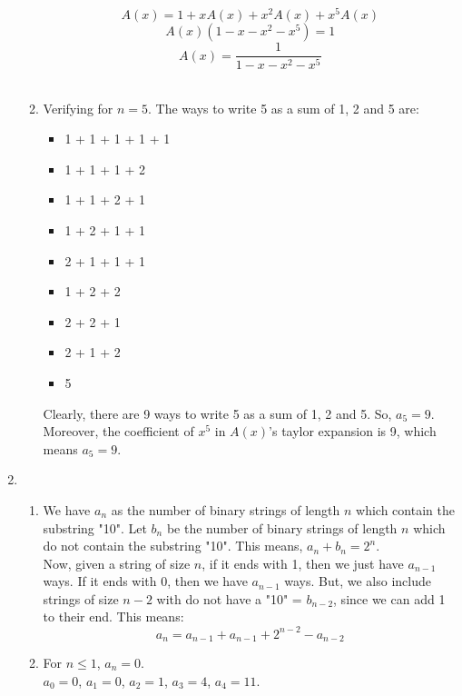 \documentclass[a4paper]{article}
\begin{document}
\begin{enumerate}
\begin{enumerate}
        \[ A(x) = 1 + xA(x) + x^2A(x) + x^5A(x) \]
        \[ A(x) (1 - x - x^2 - x^5) = 1 \]
        \[ A(x) = \frac{1}{1 - x - x^2 - x^5} \] \\

        \item Verifying for $n = 5$. The ways to write 5 as a sum of 1, 2 and 5 are:
        \begin{itemize}
            \item 1 + 1 + 1 + 1 + 1
            \item 1 + 1 + 1 + 2
            \item 1 + 1 + 2 + 1
            \item 1 + 2 + 1 + 1
            \item 2 + 1 + 1 + 1
            \item 1 + 2 + 2
            \item 2 + 2 + 1
            \item 2 + 1 + 2
            \item 5
        \end{itemize}

        Clearly, there are 9 ways to write 5 as a sum of 1, 2 and 5. So, $a_5 = 9$. Moreover, the coefficient of $x^5$ in $A(x)$'s taylor expansion is 9, which means $a_5 = 9$. \\
        \end{enumerate}


        \newpage
        \item \begin{enumerate}
            \item We have $a_n$ as the number of binary strings of length $n$ which contain the substring "10". Let $b_n$ be the number of binary strings of length $n$ which do not contain the substring "10". This means, $a_n + b_n = 2^n$. \\
            
            Now, given a string of size $n$, if it ends with 1, then we just have $a_{n-1}$ ways. If it ends with 0, then we have $a_{n-1}$ ways. But, we also include strings of size $n-2$ with do not have a "10" = $b_{n-2}$, since we can add 1 to their end. This means:
            \[ a_n = a_{n-1} + a_{n-1} + 2^{n-2} - a_{n-2} \]

            \item For $n \le 1$, $a_n = 0$. \\
            $a_0 = 0$, $a_1 = 0$, $a_2 = 1$, $a_3 = 4$, $a_4 = 11$. \\


\end{enumerate}
\end{enumerate}
\end{document}
